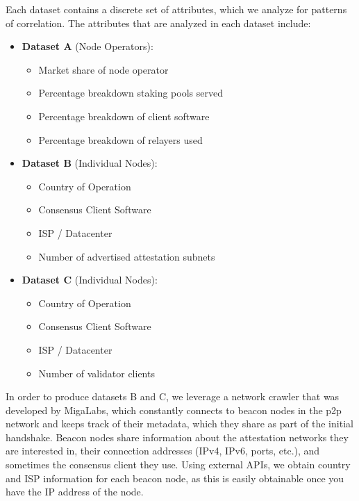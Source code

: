 \documentclass[conference]{IEEEtran}
\begin{document}
Each dataset contains a discrete set of attributes, which we analyze for patterns of correlation.  The attributes that are analyzed in each dataset include:

\begin{itemize}
    \item \textbf{Dataset A} (Node Operators):
    \begin{itemize}
        \item Market share of node operator
        \item Percentage breakdown staking pools served
        \item Percentage breakdown of client software
        \item Percentage breakdown of relayers used
    \end{itemize}
    \item \textbf{Dataset B} (Individual Nodes):
            \begin{itemize}
                \item Country of Operation
                \item Consensus Client Software
                \item ISP / Datacenter
                \item Number of advertised attestation subnets
            \end{itemize}
    \item \textbf{Dataset C} (Individual Nodes):
            \begin{itemize}
                \item Country of Operation
                \item Consensus Client Software
                \item ISP / Datacenter
                \item Number of validator clients
            \end{itemize}
\end{itemize}

In order to produce datasets B and C, we leverage a network crawler that was developed by MigaLabs, which constantly connects to beacon nodes in the p2p network and keeps track of their metadata, which they share as part of the initial handshake. Beacon nodes share information about the attestation networks they are interested in, their connection addresses (IPv4, IPv6, ports, etc.), and sometimes the consensus client they use. Using external APIs, we obtain country and ISP information for each beacon node, as this is easily obtainable once you have the IP address of the node.
\end{document}
